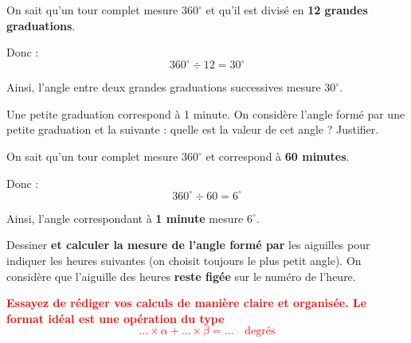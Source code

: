 \documentclass[answers]{exam}
\begin{document}
\begin{questions}
\begin{questions}
\begin{solution}
On sait qu'un tour complet mesure $360^\circ$ et qu'il est divisé en \textbf{12 grandes graduations}.

Donc :
\[
360^\circ \div 12 = 30^\circ
\]

Ainsi, l'angle entre deux grandes graduations successives mesure \textbf{$30^\circ$}.
\end{solution}

\question Une petite graduation correspond à 1 minute. On considère l'angle formé par une petite graduation et la suivante : quelle est la valeur de cet angle ? Justifier.

\begin{solution}
On sait qu'un tour complet mesure $360^\circ$ et correspond à \textbf{60 minutes}.

Donc :
\[
360^\circ \div 60 = 6^\circ
\]

Ainsi, l'angle correspondant à \textbf{1 minute} mesure \textbf{$6^\circ$}.
\end{solution}

\question Dessiner \textbf{et calculer la mesure de l'angle formé par} les aiguilles pour indiquer les heures suivantes (on choisit toujours le plus petit angle). On considère que l'aiguille des heures \textbf{reste figée} sur le numéro de l'heure.

\textcolor{red}{\textbf{Essayez de rédiger vos calculs de manière claire et organisée. Le format idéal est une opération du type}
  \[
  \ldots \times \alpha + \ldots \times \beta = \ldots \quad \text{degrés}
  \]}

\end{questions}
\end{questions}
\end{document}
